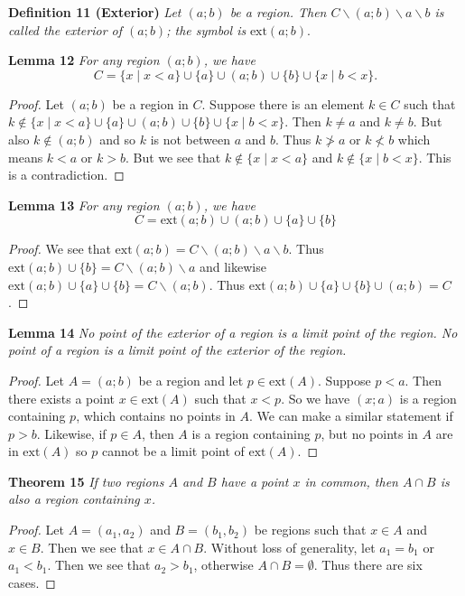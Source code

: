 \documentclass{article}
\begin{document}
\begin{flushleft}
\textbf{Definition 11 (Exterior)}
\textsl{Let $(a;b)$ be a region. Then $C \backslash (a;b) \backslash a \backslash b$ is called the exterior of $(a;b)$; the symbol is }$\text{ext}(a;b)$.\newline

\textbf{Lemma 12}
\textsl{For any region $(a;b)$, we have}
\[
C = \{ x \mid x < a \} \cup \{a\} \cup (a;b) \cup \{b\} \cup \{ x \mid b < x \}.
\]
\begin{proof}
Let $(a;b)$ be a region in $C$. Suppose there is an element $k \in C$ such that $k \notin \{ x \mid x < a \} \cup \{a\} \cup (a;b) \cup \{b\} \cup \{ x \mid b < x \}$. Then $k \neq a$ and $k \neq b$. But also $k \notin (a;b)$ and so $k$ is not between $a$ and $b$. Thus $k \not> a$ or $k \not< b$ which means $k < a$ or $k > b$. But we see that $k \notin \{ x \mid x < a \}$ and $k \notin \{ x \mid b < x \}$. This is a contradiction.
\end{proof}

\textbf{Lemma 13}
\textsl{For any region $(a;b)$, we have}
\[
C = \text{ext} (a;b) \cup (a;b) \cup \{a\} \cup \{b\}
\]
\begin{proof}
We see that $\text{ext} (a;b) = C \backslash (a;b) \backslash a \backslash b$. Thus $\text{ext} (a;b) \cup \{b\} = C \backslash (a;b) \backslash a$ and likewise $\text{ext} (a;b) \cup \{a\} \cup \{b\} = C \backslash (a;b)$. Thus $\text{ext} (a;b) \cup \{a\} \cup \{b\} \cup (a;b) = C$.
\end{proof}

\textbf{Lemma 14}
\textsl{No point of the exterior of a region is a limit point of the region. No point of a region is a limit point of the exterior of the region.}
\begin{proof}
Let $A = (a;b)$ be a region and let $p \in \text{ext}(A)$. Suppose $p<a$. Then there exists a point $x \in \text{ext}(A)$ such that $x<p$. So we have $(x;a)$ is a region containing $p$, which contains no points in $A$. We can make a similar statement if $p>b$. Likewise, if $p \in A$, then $A$ is a region containing $p$, but no points in $A$ are in $\text{ext}(A)$ so $p$ cannot be a limit point of $\text{ext}(A)$.
\end{proof}

\textbf{Theorem 15}
\textsl{If two regions $A$ and $B$ have a point $x$ in common, then $A \cap B$ is also a region containing $x$.}
\begin{proof}
Let $A=(a_1,a_2)$ and $B=(b_1,b_2)$ be regions such that $x \in A$ and $x \in B$. Then we see that $x \in A \cap B$. Without loss of generality, let $a_1=b_1$ or $a_1<b_1$. Then we see that $a_2>b_1$, otherwise $A \cap B = \emptyset$. Thus there are six cases.\newline


\end{proof}
\end{flushleft}
\end{document}
